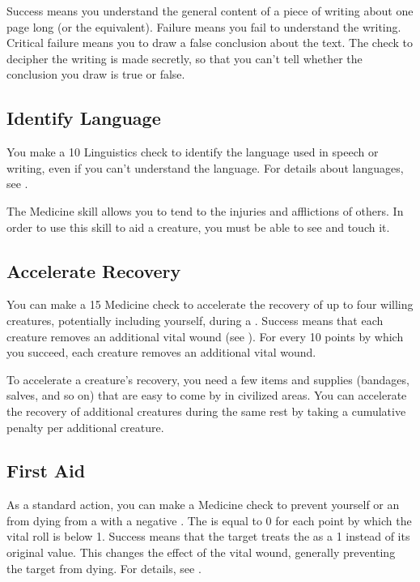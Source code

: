         Success means you understand the general content of a piece of writing about one page long (or the equivalent). Failure means you fail to understand the writing. Critical failure means you to draw a false conclusion about the text. The check to decipher the writing is made secretly, so that you can't tell whether the conclusion you draw is true or false.

    \subsection{Identify Language}
        You make a  10 Linguistics check to identify the language used in speech or writing, even if you can't understand the language.
        For details about languages, see .

\newpage
{}
        The Medicine skill allows you to tend to the injuries and afflictions of others.
        In order to use this skill to aid a creature, you must be able to see and touch it.

    \subsection{Accelerate Recovery}\label{Accelerate Recovery}
        You can make a  15 Medicine check to accelerate the recovery of up to four willing creatures, potentially including yourself, during a .
        Success means that each creature removes an additional vital wound (see ).
        For every 10 points by which you succeed, each creature removes an additional vital wound.

        To accelerate a creature's recovery, you need a few items and supplies (bandages, salves, and so on) that are easy to come by in civilized areas.
        You can accelerate the recovery of additional creatures during the same rest by taking a cumulative  penalty per additional creature.

    \subsection{First Aid}\label{First Aid}
        As a standard action, you can make a Medicine check to prevent yourself or an  from dying from a  with a negative .
        The  is equal to 0  for each point by which the vital roll is below 1.
        Success means that the target treats the  as a 1 instead of its original value.
        This changes the effect of the vital wound, generally preventing the target from dying.
        For details, see .

